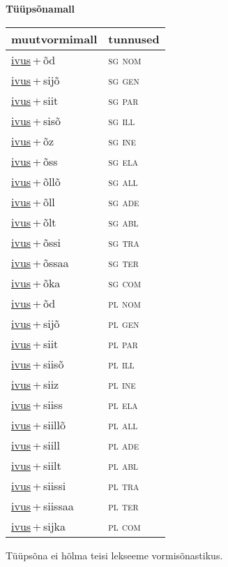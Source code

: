 
\vspace{1.8em}
\begin{minipage}{\textwidth}
\textbf{Tüüpsõnamall \,}\\

\begin{sideways}
\begin{tabular}{l l}
muutvormimall & tunnused \\
\hline
\underline{ivus}\,+\,õd & \textsc{ sg nom } \\
\underline{ivus}\,+\,sijõ & \textsc{ sg gen } \\
\underline{ivus}\,+\,siit & \textsc{ sg par } \\
\underline{ivus}\,+\,sisõ & \textsc{ sg ill } \\
\underline{ivus}\,+\,õz & \textsc{ sg ine } \\
\underline{ivus}\,+\,õss & \textsc{ sg ela } \\
\underline{ivus}\,+\,õllõ & \textsc{ sg all } \\
\underline{ivus}\,+\,õll & \textsc{ sg ade } \\
\underline{ivus}\,+\,õlt & \textsc{ sg abl } \\
\underline{ivus}\,+\,õssi & \textsc{ sg tra } \\
\underline{ivus}\,+\,õssaa & \textsc{ sg ter } \\
\underline{ivus}\,+\,õka & \textsc{ sg com } \\
\underline{ivus}\,+\,õd & \textsc{ pl nom } \\
\underline{ivus}\,+\,sijõ & \textsc{ pl gen } \\
\underline{ivus}\,+\,siit & \textsc{ pl par } \\
\underline{ivus}\,+\,siisõ & \textsc{ pl ill } \\
\underline{ivus}\,+\,siiz & \textsc{ pl ine } \\
\underline{ivus}\,+\,siiss & \textsc{ pl ela } \\
\underline{ivus}\,+\,siillõ & \textsc{ pl all } \\
\underline{ivus}\,+\,siill & \textsc{ pl ade } \\
\underline{ivus}\,+\,siilt & \textsc{ pl abl } \\
\underline{ivus}\,+\,siissi & \textsc{ pl tra } \\
\underline{ivus}\,+\,siissaa & \textsc{ pl ter } \\
\underline{ivus}\,+\,sijka & \textsc{ pl com } \\
\end{tabular}
\end{sideways}
\label{tab:tüüpsõnamall-ivusõd}

\end{minipage}

 
\vspace{1em}
\noindent Tüüpsõna ei hõlma teisi lekseeme vormi\-sõnastikus.
